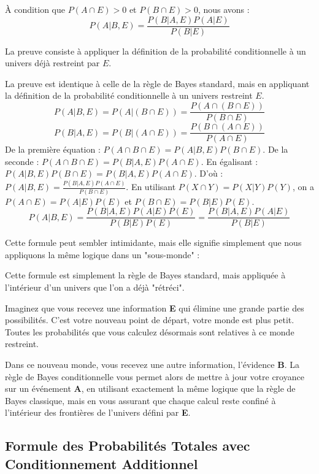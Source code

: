 \begin{theorembox}
À condition que $P(A \cap E) > 0$ et $P(B \cap E) > 0$, nous avons :
$$P(A|B, E) = \frac{P(B|A, E)P(A|E)}{P(B|E)}$$
\end{theorembox}

La preuve consiste à appliquer la définition de la probabilité conditionnelle à un univers déjà restreint par $E$.

\begin{proofbox}
La preuve est identique à celle de la règle de Bayes standard, mais en appliquant la définition de la probabilité conditionnelle à un univers restreint $E$.
$$P(A|B, E) = P(A|(B \cap E)) = \frac{P(A \cap (B \cap E))}{P(B \cap E)}$$
$$P(B|A, E) = P(B|(A \cap E)) = \frac{P(B \cap (A \cap E))}{P(A \cap E)}$$
De la première équation : $P(A \cap B \cap E) = P(A|B, E)P(B \cap E)$.
De la seconde : $P(A \cap B \cap E) = P(B|A, E)P(A \cap E)$.
En égalisant : $P(A|B, E)P(B \cap E) = P(B|A, E)P(A \cap E)$.
D'où : $P(A|B, E) = \frac{P(B|A, E)P(A \cap E)}{P(B \cap E)}$.
En utilisant $P(X \cap Y) = P(X|Y)P(Y)$, on a $P(A \cap E) = P(A|E)P(E)$ et $P(B \cap E) = P(B|E)P(E)$.
$$P(A|B, E) = \frac{P(B|A, E)P(A|E)P(E)}{P(B|E)P(E)} = \frac{P(B|A, E)P(A|E)}{P(B|E)}$$
\end{proofbox}

Cette formule peut sembler intimidante, mais elle signifie simplement que nous appliquons la même logique dans un "sous-monde" :

\begin{intuitionbox}
Cette formule est simplement la règle de Bayes standard, mais appliquée à l'intérieur d'un univers que l'on a déjà "rétréci".

Imaginez que vous recevez une information \textbf{E} qui élimine une grande partie des possibilités. C'est votre nouveau point de départ, votre monde est plus petit. Toutes les probabilités que vous calculez désormais sont relatives à ce monde restreint.

Dans ce nouveau monde, vous recevez une autre information, l'évidence \textbf{B}. La règle de Bayes conditionnelle vous permet alors de mettre à jour votre croyance sur un événement \textbf{A}, en utilisant exactement la même logique que la règle de Bayes classique, mais en vous assurant que chaque calcul reste confiné à l'intérieur des frontières de l'univers défini par \textbf{E}.
\end{intuitionbox}

\subsection{Formule des Probabilités Totales avec Conditionnement Additionnel}

